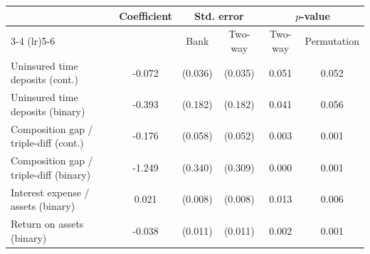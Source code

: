 \begin{tabular}{lccccc}
\toprule
 & Coefficient & \multicolumn{2}{c}{Std. error} & \multicolumn{2}{c}{$p$-value} \\
\cmidrule(lr){3-4} \cmidrule(lr){5-6}
 & & Bank & Two-way & Two-way & Permutation \\
\midrule
Uninsured time deposits (cont.) & -0.072 & (0.036) & (0.035) & 0.051 & 0.052 \\
Uninsured time deposits (binary) & -0.393 & (0.182) & (0.182) & 0.041 & 0.056 \\
Composition gap / triple-diff (cont.) & -0.176 & (0.058) & (0.052) & 0.003 & 0.001 \\
Composition gap / triple-diff (binary) & -1.249 & (0.340) & (0.309) & 0.000 & 0.001 \\
Interest expense / assets (binary) & 0.021 & (0.008) & (0.008) & 0.013 & 0.006 \\
Return on assets (binary) & -0.038 & (0.011) & (0.011) & 0.002 & 0.001 \\
\bottomrule
\end{tabular}
